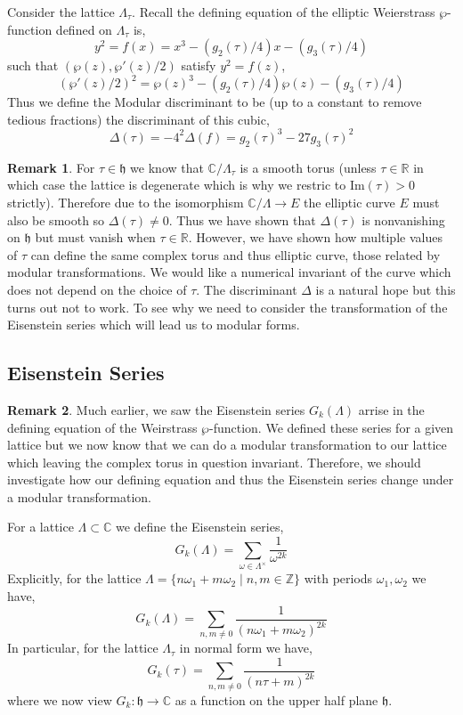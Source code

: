 \documentclass{article}
\newcommand{\Z}{\mathbb{Z}}
\newcommand{\R}{\mathbb{R}}
\newcommand{\C}{\mathbb{C}}
\renewcommand{\Im}[1]{\mathrm{Im}(#1)}
\theoremstyle{definition}
\newtheorem{remark}{Remark}[section]
\newenvironment{definition}[1][Definition:]{\begin{trivlist}
\item[\hskip \labelsep {\bfseries #1}]}{\end{trivlist}}
\newcommand{\h}{\mathfrak{h}}
\begin{document}
\begin{definition}
Consider the lattice $\Lambda_\tau$. Recall the defining equation of the elliptic Weierstrass $\wp$-function defined on $\Lambda_\tau$ is,
\[ y^2 = f(x) = x^3 - (g_2(\tau)/4) x - (g_3(\tau)/4) \]
such that $(\wp(z), \wp'(z)/2)$ satisfy $y^2 = f(z)$,
\[ (\wp'(z)/2)^2  = \wp(z)^3 - (g_2(\tau)/4) \wp(z) - (g_3(\tau)/4) \]
Thus we define the Modular discriminant to be (up to a constant to remove tedious fractions) the discriminant of this cubic,
\[ \Delta(\tau) = - 4^2 \Delta(f) =  g_2(\tau)^3 - 27  g_3(\tau)^2 \]
\end{definition}

\begin{remark}
For $\tau \in \h$ we know that $\C / \Lambda_\tau$ is a smooth torus (unless $\tau \in \R$ in which case the lattice is degenerate which is why we restric to $\Im{\tau} > 0$ strictly). Therefore due to the isomorphism $\C / \Lambda \to E$ the elliptic curve $E$ must also be smooth so $\Delta(\tau) \neq 0$. Thus we have shown that $\Delta(\tau)$ is nonvanishing on $\h$ but must vanish when $\tau \in \R$. However, we have shown how multiple values of $\tau$ can define the same complex torus and thus elliptic curve, those related by modular transformations. We would like a numerical invariant of the curve which does not depend on the choice of $\tau$. The discriminant $\Delta$ is a natural hope but this turns out not to work. To see why we need to consider the transformation of the Eisenstein series which will lead us to modular forms. 
\end{remark}

\subsection{Eisenstein Series}

\begin{remark}
Much earlier, we saw the Eisenstein series $G_k(\Lambda)$ arrise in the defining equation of the Weirstrass $\wp$-function. We defined these series for a given lattice but we now know that we can do a modular transformation to our lattice which leaving the complex torus in question invariant. Therefore, we should investigate how our defining equation and thus the Eisenstein series change under a modular transformation.  
\end{remark}

\begin{definition}
For a lattice $\Lambda \subset \C$ we define the Eisenstein series,
\[ G_k(\Lambda) = \sum_{\omega \in \Lambda^\times} \frac{1}{\omega^{2k}} \]
Explicitly, for the lattice $\Lambda = \{ n \omega_1 + m \omega_2 \mid n,m \in \Z \}$ with periods $\omega_1, \omega_2$ we have,
\[ G_k(\Lambda) = \sum_{n,m \neq 0} \frac{1}{(n \omega_1 + m \omega_2)^{2k}} \]
In particular, for the lattice $\Lambda_{\tau}$ in normal form we have,
\[ G_k(\tau) = \sum_{n,m \neq 0} \frac{1}{(n \tau + m)^{2k}} \]
where we now view $G_k : \h \to \C$ as a function on the upper half plane $\h$. 
\end{definition}
\end{document}
